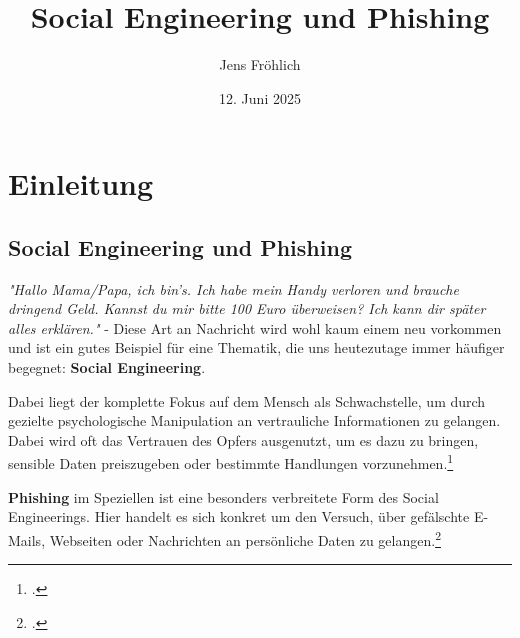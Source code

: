 \documentclass[12pt, a4paper, oneside]{scrartcl}
\title{Social Engineering und Phishing}
\author{Jens Fröhlich}
\date{12. Juni 2025}
\begin{document}

\begin{titlepage}
    \thispagestyle{empty}
    \maketitle
    \vspace{2cm}
    \begin{center}
    \end{center}
\end{titlepage}


\clearpage
\pagestyle{empty}
\tableofcontents


\justify


\pagestyle{scrheadings}
\clearpairofpagestyles

\ihead{}
\chead{}
\ohead{}

\ifoot{}
\cfoot[\pagemark]{\pagemark}
\ofoot{}

\setcounter{page}{2}

\section{Einleitung}

\subsection{Social Engineering und Phishing}
\textit{"Hallo Mama/Papa, ich bin's. Ich habe mein Handy verloren und 
brauche dringend Geld. Kannst du mir bitte 100 Euro überweisen? 
Ich kann dir später alles erklären."} - Diese Art an Nachricht wird wohl kaum einem
neu vorkommen und ist ein gutes Beispiel für eine Thematik, die uns heutezutage immer häufiger begegnet:
\textbf{Social Engineering}.
\par
Dabei liegt der komplette Fokus auf dem Mensch als Schwachstelle, um durch gezielte psychologische
Manipulation an vertrauliche Informationen zu gelangen. Dabei wird oft das Vertrauen des Opfers ausgenutzt, 
um es dazu zu bringen, sensible Daten preiszugeben oder bestimmte Handlungen vorzunehmen.\footcite{BSISocialEngineering}
\par
\textbf{Phishing} im Speziellen ist eine besonders verbreitete Form des Social Engineerings. 
Hier handelt es sich konkret um den Versuch, über gefälschte E-Mails, Webseiten oder 
Nachrichten an persönliche Daten zu gelangen.\footcite{BSIPhishing}\\
\end{document}
